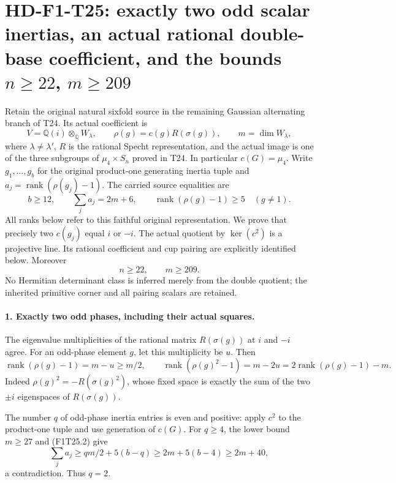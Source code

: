 \section[HD-F1-T25: the residual Gaussian source has a rational double base]{HD-F1-T25: exactly two odd scalar inertias, an actual rational double-base coefficient, and the bounds $n\ge22$, $m\ge209$}
\label{sec:f1-gaussian-specht-double-base}

Retain the original natural sixfold source in the remaining
Gaussian alternating branch of T24. Its actual coefficient is
\[
 V=\mathbb Q(i)\otimes_{\mathbb Q}W_\lambda,
 \qquad \rho(g)=c(g)R(\sigma(g)),\qquad m=\dim W_\lambda,
 \tag{F1T25.1}
\]
where $\lambda\ne\lambda'$, $R$ is the rational Specht
representation, and the actual image is one of the three
subgroups of $\mu_4\times S_n$ proved in T24. In particular
$c(G)=\mu_4$. Write $g_1,\ldots,g_b$ for the original
product-one generating inertia tuple and $a_j=\operatorname{rank}
(\rho(g_j)-1)$. The carried source equalities are
\[
 b\ge12,\qquad \sum_j a_j=2m+6,
 \qquad \operatorname{rank}(\rho(g)-1)\ge5
                  \quad(g\ne1).
 \tag{F1T25.2}
\]
All ranks below refer to this faithful original representation.
We prove that precisely two $c(g_j)$ equal $i$ or $-i$.
The actual quotient by $\ker(c^2)$ is a projective line.
Its rational coefficient and cup pairing are explicitly
identified below. Moreover
\[
                         n\ge22,\qquad m\ge209.
 \tag{F1T25.3}
\]
No Hermitian determinant class is inferred merely from the
double quotient; the inherited primitive corner and all pairing
scalars are retained.

\paragraph{1. Exactly two odd phases, including their actual squares.}
The eigenvalue multiplicities of the rational matrix
$R(\sigma(g))$ at $i$ and $-i$ agree. For an odd-phase
element $g$, let this multiplicity be $u$. Then
\[
 \operatorname{rank}(\rho(g)-1)=m-u\ge m/2,
 \qquad
 \operatorname{rank}(\rho(g)^2-1)=m-2u
              =2\operatorname{rank}(\rho(g)-1)-m.
 \tag{F1T25.4}
\]
Indeed $\rho(g)^2=-R(\sigma(g)^2)$, whose fixed space
is exactly the sum of the two $\pm i$ eigenspaces of
$R(\sigma(g))$.

The number $q$ of odd-phase inertia entries is even and
positive: apply $c^2$ to the product-one tuple and use
generation of $c(G)$. For $q\ge4$, the lower bound
$m\ge27$ and (F1T25.2) give
\[
 \sum_j a_j\ge q m/2+5(b-q)
       \ge 2m+5(b-4)\ge2m+40,
\]
a contradiction. Thus $q=2$.

